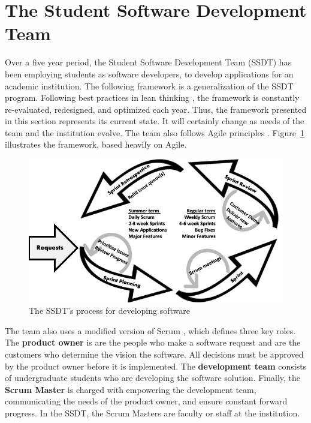 \section{The Student Software Development Team}
Over a five year period, the Student Software Development Team (SSDT) has been employing students as software developers, to develop applications for an academic institution. The following framework is a generalization of the SSDT program. Following best practices in lean thinking \cite{lean}, the framework is constantly re-evaluated, redesigned, and optimized each year. Thus, the framework presented in this section represents its current state. It will certainly change as needs of the team and the institution evolve. The team also follows Agile principles \cite{agilemanifesto} . Figure~\ref{fig:framework} illustrates the framework, based heavily on Agile.

\begin{figure}[htbp]
 \centering
 \includegraphics[width=\linewidth]{developmentcycle4.jpg}
 \caption{The SSDT's process for developing software}
 \label{fig:framework}
\end{figure}

The team also uses a modified version of Scrum \cite{thescrumguide}, which defines three key roles. The \textbf{product owner} is are the people who make a software request and are the customers who determine the vision the software. All decisions must be approved by the product owner before it is implemented. The \textbf{development team} consists of undergraduate students who are developing the software solution. Finally, the \textbf{Scrum Master} is charged with empowering the development team, communicating the needs of the product owner, and ensure constant forward progress. In the SSDT, the Scrum Masters are faculty or staff at the institution.

